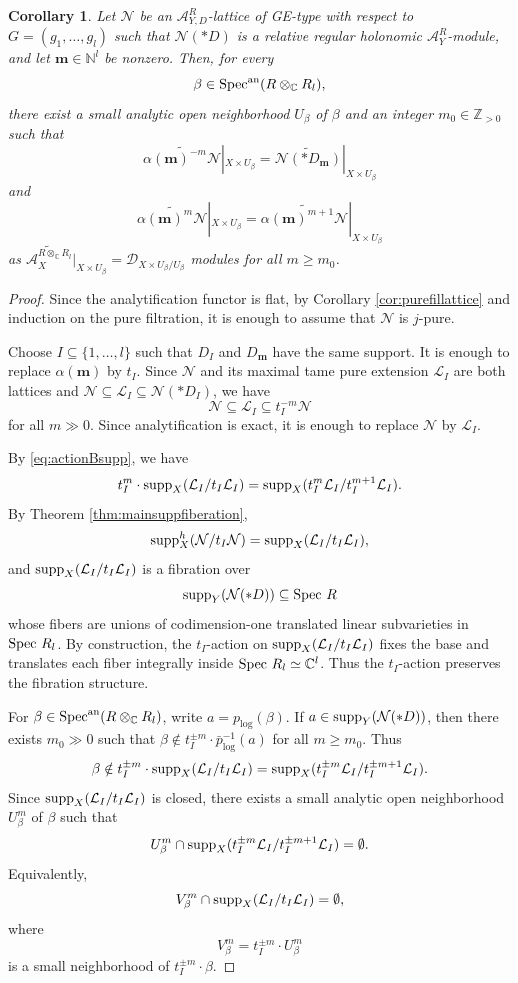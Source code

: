 \documentclass{amsart}
\theoremstyle{plain}
\numberwithin{theorem}{section}
\newtheorem{coro}[theorem]{Corollary}
\theoremstyle{definition}
\theoremstyle{remark}
\theoremstyle{definition}
\newcommand{\C}{\mathbb{C}} %
\newcommand{\N}{\mathbb{N}}
\newcommand{\Z}{\mathbb{Z}}
\newcommand{\cL}{\mathcal{L}}
\newcommand{\cN}{\mathcal{N}}
\newcommand{\bm}{\mathbf{m}}
\newcommand{\sA}{\mathscr{A}}
\newcommand{\shD}{\mathscr{D}}
\newcommand{\Spec}{\textup{Spec }}
\newcommand{\Specan}{\textup{Spec}^{\textup{an}}}
\newcommand{\supp}{\textup{supp}}
\begin{document}
\begin{coro}\label{cor:anlocmaxminex}
Let $\cN$ be an $\sA^R_{Y,D}$-lattice of GE-type with respect to
$G=(g_1,\dots,g_l)$
such that $\cN(*D)$ is a relative regular holonomic $\sA^R_Y$-module, and let $\bm\in \N^l$ be nonzero. Then, for every
\[
\beta\in \Specan(R\otimes_\C R_l),
\]
there exist a small analytic open neighborhood $U_\beta$ of $\beta$ and an integer $m_0\in \Z_{>0}$ such that
\[
\widetilde{\alpha(\bm)^{-m}\cN}|_{X\times U_\beta}
=
\widetilde{\cN(*D_\bm)}|_{X\times U_\beta}
\]
and
\[
\widetilde{\alpha(\bm)^m\cN}|_{X\times U_\beta}
=
\widetilde{\alpha(\bm)^{m+1}\cN}|_{X\times U_\beta}
\]
as
$
\widetilde{\sA_X^{R\otimes_\C R_l}}|_{X\times U_\beta}
=
\shD_{X\times U_\beta/U_\beta}
$
modules for all $m\ge m_0$.
\end{coro}

\begin{proof}
Since the analytification functor is flat, by Corollary \ref{cor:purefillattice} and induction on the pure filtration, it is enough to assume that $\cN$ is $j$-pure.

Choose $I\subseteq\{1,\dots,l\}$ such that $D_I$ and $D_\bm$ have the same support. It is enough to replace $\alpha(\bm)$ by $t_I$. Since $\cN$ and its maximal tame pure extension $\cL_I$ are both lattices and
$\cN\subseteq\cL_I\subseteq\cN(*D_I)$,
we have
\[
\cN\subseteq\cL_I\subseteq t_I^{-m}\cN
\]
for all $m\gg 0$. Since analytification is exact, it is enough to replace $\cN$ by $\cL_I$.

By \eqref{eq:actionBsupp}, we have
\[
t_I^m\cdot
\supp_X(\cL_I/t_I\cL_I)
=
\supp_X(t_I^m\cL_I/t_I^{m+1}\cL_I).
\]
By Theorem \ref{thm:mainsuppfiberation},
\[
\supp^h_X(\cN/t_I\cN)
=
\supp_X(\cL_I/t_I\cL_I),
\]
and $\supp_X(\cL_I/t_I\cL_I)$ is a fibration over
\[
\supp_Y(\cN(*D))\subseteq \Spec R
\]
whose fibers are unions of codimension-one translated linear subvarieties in $\Spec R_l$. By construction, the $t_I$-action on $\supp_X(\cL_I/t_I\cL_I)$ fixes the base and translates each fiber integrally inside
$\Spec R_l\simeq \C^l$.
Thus the $t_I$-action preserves the fibration structure.

For
$\beta\in \Specan(R\otimes_\C R_l)$,
write
$a=p_{\log}(\beta)$.
If
$a\in \supp_Y(\cN(*D))$,
then there exists $m_0\gg0$ such that
$\beta\notin t_I^{\pm m}\cdot\bar p_{\log}^{-1}(a)$
for all $m\ge m_0$. Thus
\[
\beta\notin
t_I^{\pm m}\cdot
\supp_X(\cL_I/t_I\cL_I)
=
\supp_X(t_I^{\pm m}\cL_I/t_I^{\pm m+1}\cL_I).
\]
Since $\supp_X(\cL_I/t_I\cL_I)$ is closed, there exists a small analytic open neighborhood $U^m_\beta$ of $\beta$ such that
\[
U^m_\beta
\cap
\supp_X(t_I^{\pm m}\cL_I/t_I^{\pm m+1}\cL_I)
=
\emptyset.
\]
Equivalently,
\[
V^m_\beta
\cap
\supp_X(\cL_I/t_I\cL_I)
=
\emptyset,
\]
where
\[
V^m_\beta=t_I^{\pm m}\cdot U^m_\beta
\]
is a small neighborhood of $t_I^{\pm m}\cdot\beta$.


\end{proof}
\end{document}
